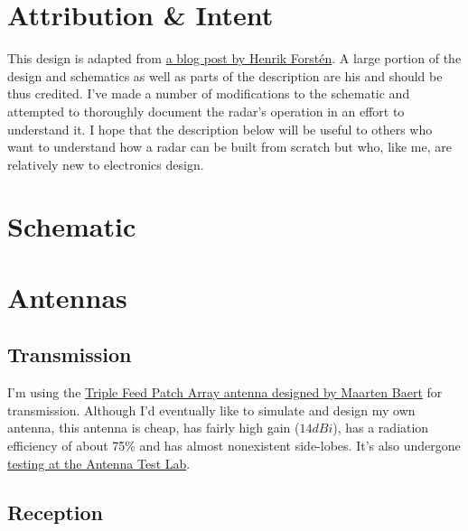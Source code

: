 \documentclass{default}
\begin{document}
\tableofcontents
\hypersetup{linkcolor=red}

\chapter{Attribution \& Intent}
\label{cha:attribution}

This design is adapted from
\href{http://hforsten.com/third-version-of-homemade-6-ghz-fmcw-radar.html}{a blog post by Henrik
  Forst\'en}. A large portion of the design and schematics as well as parts of the description are
his and should be thus credited. I've made a number of modifications to the schematic and attempted
to thoroughly document the radar's operation in an effort to understand it. I hope that the
description below will be useful to others who want to understand how a radar can be built from
scratch but who, like me, are relatively new to electronics design.



\chapter{Schematic}
\label{cha:schematic}













\chapter{Antennas}
\label{cha:antennas}

\section{Transmission}
\label{sec:antenna-transmission}

I'm using the
\href{https://www.maartenbaert.be/quadcopters/antennas/triple-feed-patch-array-antenna/}{Triple Feed
  Patch Array antenna designed by Maarten Baert} for transmission. Although I'd eventually like to
simulate and design my own antenna, this antenna is cheap, has fairly high gain ($14 \si{dBi}$), has
a radiation efficiency of about 75\% and has almost nonexistent side-lobes. It's also undergone
\href{https://antennatestlab.com/antenna-examples/example-8-triple-feed-patch-array-circularly-polarized-antenna}{testing
  at the Antenna Test Lab}.

\section{Reception}
\label{sec:antenna-reception}
\end{document}
